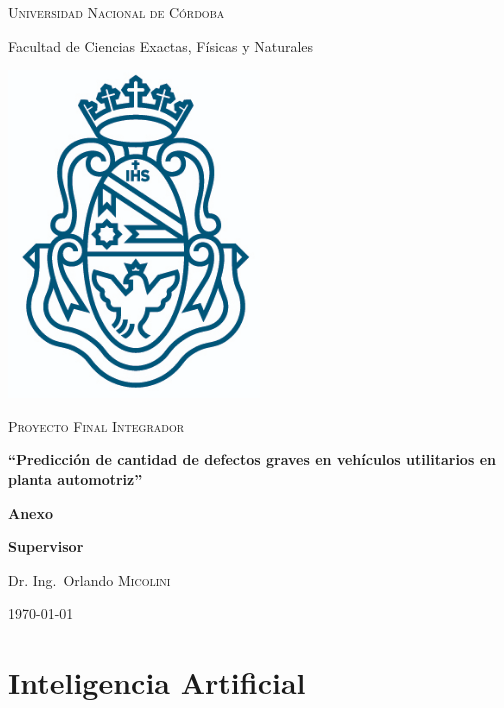 \documentclass[a4paper,12pt]{article}
\author{Gerardo A. COLLANTE \\ Matrícula: 39.022.782 \\ Email: \href{mailto:gerardo.collante@unc.edu.ar}{gerardo.collante@unc.edu.ar} \\ Cel: 54 (03574) 650490}
\begin{document}
\makeatletter
\begin{titlepage}
		
	{\scshape\LARGE Universidad Nacional de Córdoba \par}
	{\Large Facultad de Ciencias Exactas, Físicas y Naturales \par}
	\vspace{0.5cm}
	\centering
	\includegraphics[width=0.5\textwidth]{unc.png}
	\par\vspace{0.5cm}
	\vspace{0.5cm}
	{\scshape\Large Proyecto Final Integrador\par}
	\vspace{1cm}
	{\large\bfseries ``Predicción de cantidad de defectos graves en vehículos utilitarios en planta automotriz'' \par}
	\vspace{0.5cm}
		
	\textbf{Anexo}
	\vspace{0.5cm}
		
	\normalsize\@author\space
		
	\vspace{0.5cm}
	\textbf{Supervisor}\par
	Dr. Ing.~Orlando \textsc{Micolini}
	
	\vfill
	
	{\large \today\par}
\end{titlepage}

\tableofcontents

\clearpage

\section{Inteligencia Artificial}
\end{document}
